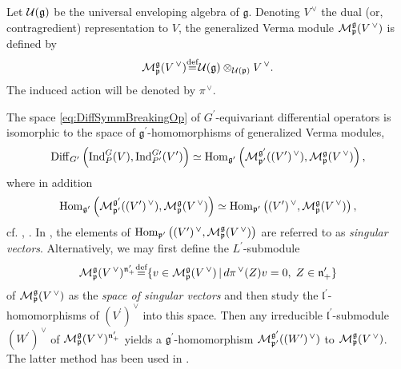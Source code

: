 \documentclass[a4paper,12pt,reqno]{amsart}
\numberwithin{theorem}{subsection}
\numberwithin{equation}{section}
\begin{document}
Let ${\fam2 U}({{\mathfrak g}})$ be the universal enveloping algebra of ${{\mathfrak g}}$. Denoting
$V^{{\,\vee}}$ the dual (or, contragredient) representation to $V$, the generalized
Verma module ${\fam2 M}^{{\mathfrak g}}_{{\mathfrak p}}(V^{{\,\vee}})$ is defined by
\begin{equation*}
   {\fam2 M}^{{\mathfrak g}}_{{\mathfrak p}}(V^{{\,\vee}}) {\stackrel{\text{def}}{=}} {\fam2 U}({{\mathfrak g}})\otimes_{{\fam2 U}({{\mathfrak p}})} V^{{\,\vee}}.
\end{equation*}
The induced action will be denoted by $\pi^{{\,\vee}}$.

The space \eqref{eq:DiffSymmBreakingOp} of $G^\prime$-equivariant differential
operators is isomorphic to the space of ${{\mathfrak g}}^\prime$-homomorphisms of
generalized Verma modules,
\begin{equation}\label{eq:one-to-one}
   {\operatorname{Diff}}_{G^\prime}\left({\operatorname{Ind}}^{G}_{P}(V),{\operatorname{Ind}}^{G\prime}_{P^\prime}(V^\prime)\right)\simeq
   {\operatorname{Hom}}_{{{\mathfrak g}}^\prime} \left({\fam2 M}^{{{\mathfrak g}}^\prime}_{{{\mathfrak p}}^\prime}( (V^\prime)^{{\,\vee}}),
   {\fam2 M}^{{\mathfrak g}}_{{\mathfrak p}}(V^{{\,\vee}}) \right),
\end{equation}
where in addition
\begin{align}\label{eq:isomorphism1}
   {\operatorname{Hom}}_{{{\mathfrak g}}^\prime} \left({\fam2 M}^{{{\mathfrak g}}^\prime}_{{{\mathfrak p}}^\prime}(
   (V^\prime)^{{\,\vee}}), {\fam2 M}^{{\mathfrak g}}_{{\mathfrak p}}(V^{{\,\vee}}) \right) \simeq
   {\operatorname{Hom}}_{{{\mathfrak p}}^\prime}\left( (V^\prime)^{{\,\vee}},{\fam2M}^{{\mathfrak g}}_{{\mathfrak p}}(V^{{\,\vee}}) \right),
\end{align}
cf. \cite[Theorem $2.7$]{Kobayashi-Pevzner}, \cite{koss}. In
\cite{Kobayashi-Pevzner}, the elements of ${\operatorname{Hom}}_{{{\mathfrak p}}^\prime} \left(
(V^\prime)^{{\,\vee}},{\fam2M}^{{\mathfrak g}}_{{\mathfrak p}}(V^{{\,\vee}}) \right)$ are referred to as {\it
singular vectors}. Alternatively, we may first define the $L^\prime$-submodule
\begin{equation}\label{eq:SingularVectors}
   {\fam2 M}^{{\mathfrak g}}_{{\mathfrak p}}(V^{{\,\vee}})^{{{\mathfrak n}}^\prime_+}
   {\stackrel{\text{def}}{=}} \{v\in {\fam2 M}^{{\mathfrak g}}_{{\mathfrak p}}(V^{{\,\vee}}) \,|\, {d}\pi^{{\,\vee}}(Z)v=0, \; Z \in {{\mathfrak n}}^\prime_+\}
\end{equation}
of ${\fam2 M}^{{\mathfrak g}}_{{\mathfrak p}}(V^{{\,\vee}})$ as the {\em space of singular vectors} and
then study the ${{\mathfrak l}}^\prime$-homomorphisms of $(V^\prime)^{{\,\vee}}$ into this space.
Then any irreducible ${{\mathfrak l}}^\prime$-submodule $(W^\prime)^{{\,\vee}}$ of ${\fam2
M}^{{\mathfrak g}}_{{\mathfrak p}}(V^{{\,\vee}})^{{{\mathfrak n}}^\prime_+}$ yields a ${{\mathfrak g}}^\prime$-homomorphism
${\fam2 M}^{{{\mathfrak g}}^\prime}_{{{\mathfrak p}}^\prime}((W^\prime)^{{\,\vee}})$ to ${\fam2
M}^{{\mathfrak g}}_{{\mathfrak p}}(V^{{\,\vee}})$. The latter method has been used in \cite{koss}.
\end{document}
